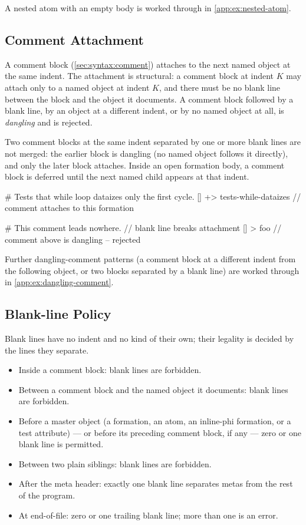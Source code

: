 A nested atom with an empty body is worked through in
  \cref{app:ex:nested-atom}.

\subsection{Comment Attachment}\label{sec:wf:comments}

A comment block (\cref{sec:syntax:comment}) attaches to the next named
  object at the same indent.
The attachment is structural: a comment block at indent \(K\) may attach
  only to a named object at indent \(K\), and there must be no blank line
  between the block and the object it documents.
A comment block followed by a blank line, by an object at a different
  indent, or by no named object at all, is \emph{dangling}
  and is rejected.

Two comment blocks at the same indent separated by one or more blank lines
  are not merged: the earlier block is dangling
  (no named object follows it directly),
  and only the later block attaches.
Inside an open formation body, a comment block is deferred until the next
  named child appears at that indent.

\begin{ffcode}
# Tests that while loop dataizes only the first cycle.
[] +> tests-while-dataizes    // comment attaches to this formation

# This comment leads nowhere.
                              // blank line breaks attachment
[] > foo                      // comment above is dangling -- rejected
\end{ffcode}

Further dangling-comment patterns (a comment block at a different
  indent from the following object, or two blocks separated by a
  blank line) are worked through in \cref{app:ex:dangling-comment}.

\subsection{Blank-line Policy}\label{sec:wf:blanks}

Blank lines have no indent and no kind of their own; their legality is
  decided by the lines they separate.

\begin{itemize}
  \item Inside a comment block: blank lines are forbidden.
  \item Between a comment block and the named object it documents:
    blank lines are forbidden.
  \item Before a master object (a formation, an atom, an inline-phi
    formation, or a \ff{+>} test attribute) ---
    or before its preceding comment block, if any ---
    zero or one blank line is permitted.
  \item Between two plain siblings: blank lines are forbidden.
  \item After the meta header: exactly one blank line separates metas from
    the rest of the program.
  \item At end-of-file: zero or one trailing blank line; more than one is
    an error.
\end{itemize}

